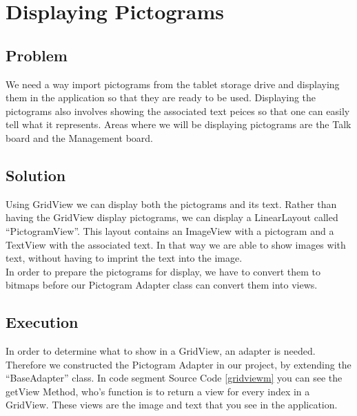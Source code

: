 \section{Displaying Pictograms} %
\label{disppict}

\subsection*{Problem}
We need a way import pictograms from the tablet storage drive and displaying them in the application so that they are ready to be used.
Displaying the pictograms also involves showing the associated text peices so that one can easily tell what it represents.
Areas where we will be displaying pictograms are the Talk board and the Management board.

\subsection*{Solution}
Using GridView we can display both the pictograms and its text.
Rather than having the GridView display pictograms, we can display a LinearLayout called ``PictogramView''.
This layout contains an ImageView with a pictogram and a TextView with the associated text.
In that way we are able to show images with text, without having to imprint the text into the image.\\

In order to prepare the pictograms for display, we have to convert them to bitmaps before our Pictogram Adapter class can convert them into views.

\subsection*{Execution}
In order to determine what to show in a GridView, an adapter is needed. Therefore we constructed the Pictogram Adapter in our project, by extending the ``BaseAdapter'' class.
In code segment Source Code \ref{gridviewm} you can see the getView Method, who's function is to return a view for every index in a GridView.
These views are the image and text that you see in the application.\\


